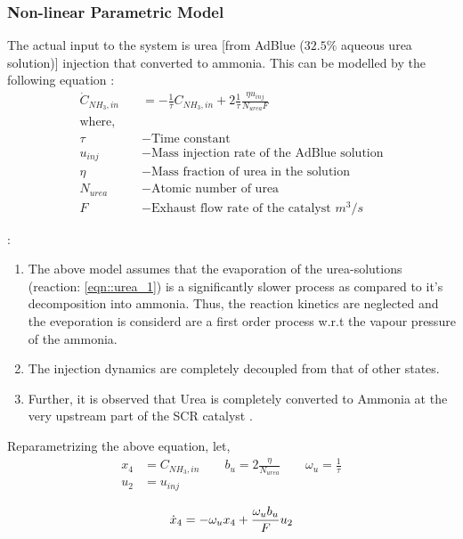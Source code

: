 \subsubsection{Non-linear Parametric Model}
The actual input to the system is urea [from AdBlue ($32.5\%$ aqueous urea
solution)] injection that converted to ammonia. This can be modelled by the following equation \cite{nova2014urea}:
\begin{align*}
    \dot C_{NH_3, in} &= - \frac{1}{\tau} C_{NH_3, in} + 2 \frac{1}{\tau} \frac{ \eta u_{inj}}{N_{urea} F}\\
    \text{where, } \quad &\\
    \tau &- \text{Time constant}\\
    u_{inj} &- \text{Mass injection rate of the AdBlue solution}\\
    \eta &- \text{Mass fraction of urea in the solution}\\
    N_{urea} &- \text{Atomic number of urea}\\
    F &- \text{Exhaust flow rate of the catalyst } m^3/s
\end{align*}

:
\begin{enumerate}
    \item The above model assumes that the evaporation of the urea-solutions
        (reaction: \ref{eqn::urea_1}) is a significantly slower process as
        compared to it's decomposition into ammonia. Thus, the reaction
        kinetics are neglected and the eveporation is considerd are a first
        order process w.r.t the vapour pressure of the ammonia.
    \item The injection dynamics are completely decoupled from that of other
        states.
    \item Further, it is observed that Urea is completely converted to Ammonia
        at the very upstream part of the SCR catalyst
        \cite{hsieh2011development}.
\end{enumerate}

Reparametrizing the above equation, let,
\begin{align*}
    x_4 &= C_{NH_3, in} \qquad b_u = 2 \frac{ \eta}{N_{urea}} \qquad \omega_u = \frac{1}{\tau}\\
    u_2 &= u_{inj}
\end{align*}

\begin{equation}{\label{eqn::urea_inj}}
    \dot x_4 = - \omega_u x_4 +   \frac{\omega_u b_u}{F} u_{2}
\end{equation}

